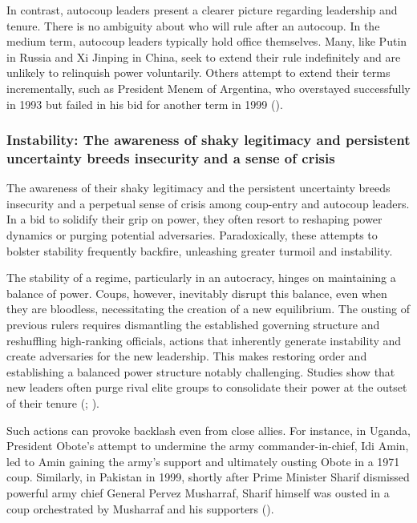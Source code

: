 \documentclass[
  12pt,
]{report}
\begin{document}
In contrast, autocoup leaders present a clearer picture regarding
leadership and tenure. There is no ambiguity about who will rule after
an autocoup. In the medium term, autocoup leaders typically hold office
themselves. Many, like Putin in Russia and Xi Jinping in China, seek to
extend their rule indefinitely and are unlikely to relinquish power
voluntarily. Others attempt to extend their terms incrementally, such as
President Menem of Argentina, who overstayed successfully in 1993 but
failed in his bid for another term in 1999
().

\subsubsection{\texorpdfstring{\textbf{Instability:} The awareness of
shaky legitimacy and persistent uncertainty breeds insecurity and a
sense of
crisis}{Instability: The awareness of shaky legitimacy and persistent uncertainty breeds insecurity and a sense of crisis}}\label{instability-the-awareness-of-shaky-legitimacy-and-persistent-uncertainty-breeds-insecurity-and-a-sense-of-crisis}

The awareness of their shaky legitimacy and the persistent uncertainty
breeds insecurity and a perpetual sense of crisis among coup-entry and
autocoup leaders. In a bid to solidify their grip on power, they often
resort to reshaping power dynamics or purging potential adversaries.
Paradoxically, these attempts to bolster stability frequently backfire,
unleashing greater turmoil and instability.

The stability of a regime, particularly in an autocracy, hinges on
maintaining a balance of power. Coups, however, inevitably disrupt this
balance, even when they are bloodless, necessitating the creation of a
new equilibrium. The ousting of previous rulers requires dismantling the
established governing structure and reshuffling high-ranking officials,
actions that inherently generate instability and create adversaries for
the new leadership. This makes restoring order and establishing a
balanced power structure notably challenging. Studies show that new
leaders often purge rival elite groups to consolidate their power at the
outset of their tenure (;
).

Such actions can provoke backlash even from close allies. For instance,
in Uganda, President Obote's attempt to undermine the army
commander-in-chief, Idi Amin, led to Amin gaining the army's support and
ultimately ousting Obote in a 1971 coup. Similarly, in Pakistan in 1999,
shortly after Prime Minister Sharif dismissed powerful army chief
General Pervez Musharraf, Sharif himself was ousted in a coup
orchestrated by Musharraf and his supporters
().
\end{document}
